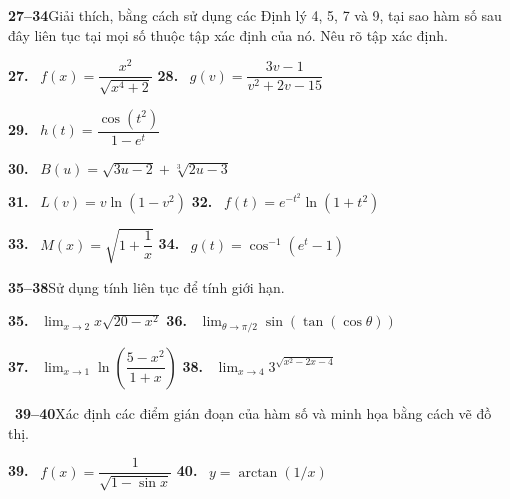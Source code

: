 \begin{minipage}[t]{0.485\textwidth}
\noindent
\textbf{\color{stewartcyan}27--34}\enspace Giải thích, bằng cách sử dụng các Định lý 4, 5, 7 và 9, tại sao hàm số sau đây liên tục tại mọi số thuộc tập xác định của nó. Nêu rõ tập xác định.

\vspace{6pt}
\noindent
\textbf{27.} \ $f(x) = \dfrac{x^2}{\sqrt{x^4 + 2}}$ \hfill \textbf{28.} \ $g(v) = \dfrac{3v - 1}{v^2 + 2v - 15}$

\vspace{7pt}
\noindent
\textbf{29.} \ $h(t) = \dfrac{\cos(t^2)}{1 - e^t}$

\vspace{6pt}
\noindent
\textbf{30.} \ $B(u) = \sqrt{3u - 2} + \sqrt[3]{2u - 3}$

\vspace{6pt}
\noindent
\textbf{31.} \ $L(v) = v \ln(1 - v^2)$ \hfill \textbf{32.} \ $f(t) = e^{-t^2}\ln(1 + t^2)$

\vspace{8pt}
\noindent
\textbf{33.} \ $M(x) = \sqrt{1 + \dfrac{1}{x}}$ \hfill \textbf{34.} \ $g(t) = \cos^{-1}(e^t - 1)$

\vspace{6pt}
\noindent{\color{lightcyanline}\rule{\linewidth}{0.8pt}}
\vspace{5pt}

\noindent
\textbf{\color{stewartcyan}35--38}\enspace Sử dụng tính liên tục để tính giới hạn.

\vspace{6pt}
\noindent
\textbf{35.} \ $\lim_{x \to 2} x\sqrt{20 - x^2}$ \hfill \textbf{36.} \ $\lim_{\theta \to \pi/2} \sin(\tan(\cos \theta))$

\vspace{9pt}
\noindent
\textbf{37.} \ $\lim_{x \to 1} \ln\left(\dfrac{5 - x^2}{1 + x}\right)$ \hfill \textbf{38.} \ $\lim_{x \to 4} 3^{\sqrt{x^2 - 2x - 4}}$

\vspace{6pt}
\noindent{\color{lightcyanline}\rule{\linewidth}{0.8pt}}
\vspace{5pt}

\noindent
\graphingcalcicon\ \textbf{\color{stewartcyan}39--40}\enspace Xác định các điểm gián đoạn của hàm số và minh họa bằng cách vẽ đồ thị.

\vspace{6pt}
\noindent
\textbf{39.} \ $f(x) = \dfrac{1}{\sqrt{1 - \sin x}}$ \hfill \textbf{40.} \ $y = \arctan(1/x)$

\end{minipage}%
